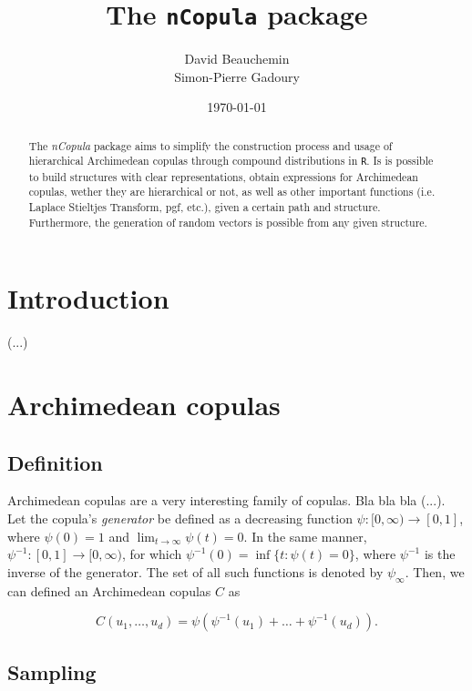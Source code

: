 \documentclass[11pt, english]{article}\usepackage[]{graphicx}\usepackage[]{color}
\title{The \texttt{nCopula} package}
\author{David Beauchemin \\ Simon-Pierre Gadoury}
\date{\today}
\begin{document}
\maketitle

\begin{abstract}
The \emph{nCopula} package aims to simplify the construction process and usage of hierarchical Archimedean copulas through compound distributions in \texttt{R}. Is is possible to build structures with clear representations, obtain expressions for Archimedean copulas, wether they are hierarchical or not, as well as other important functions (i.e. Laplace Stieltjes Transform, pgf, etc.), given a certain path and structure. Furthermore, the generation of random vectors is possible from any given structure.
\end{abstract}

\tableofcontents

\section{Introduction}

(...)

\section{Archimedean copulas}

\subsection{Definition}

Archimedean copulas are a very interesting family of copulas. Bla bla bla (...). \\

Let the copula's \emph{generator} be defined as a decreasing function $\psi : [0, \infty) \to [0, 1]$, where $\psi(0) = 1$ and $\lim_{t \to \infty} \psi(t) = 0$. In the same manner, $\psi^{-1} : [0, 1] \to [0, \infty)$, for which $\psi^{-1}(0) = \inf\{t : \psi(t) = 0\}$, where $\psi^{-1}$ is the inverse of the generator. The set of all such functions is denoted by $\psi_\infty$. Then, we can defined an Archimedean copulas $C$ as

\begin{equation}
  C(u_1, \ldots, u_d) = \psi \left( \psi^{-1}(u_1) + \ldots + \psi^{-1}(u_d) \right).
\end{equation}

\subsection{Sampling}
\end{document}
